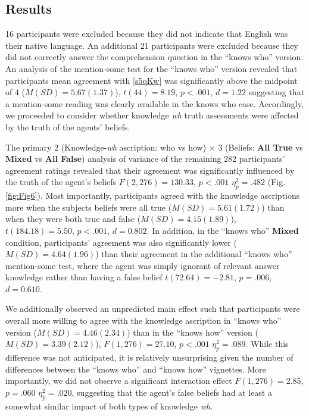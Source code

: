 \documentclass[a4paper]{article}
\begin{document}
\subsection{Results}

16 participants were excluded because they did not indicate that English was their native language. An additional 21 participants were excluded because they did not correctly answer the comprehension question in the ``knows who'' version. An analysis of the mention-some test for the ``knows who'' version revealed that participants mean agreement with \ref{s5qKw} was significantly above the midpoint of 4 (${M}({SD}) = 5.67(1.37)$), $t(44) = 8.19$, $p < .001$, $d = 1.22$ suggesting that a mention-some reading was clearly available in the knows who case. Accordingly, we proceeded to consider whether knowledge \textit{wh} truth assessments were affected by the truth of the agents' beliefs.

The primary 2 (Knowledge-\textit{wh} ascription: who vs how) $\times$ 3 (Beliefs: \textbf{All True} vs \textbf{Mixed} vs \textbf{All False}) analysis of variance of the remaining 282 participants' agreement ratings revealed that their agreement was significantly influenced by the truth of the agent's beliefs $F(2,276) = 130.33$, $p < .001$ $\eta_{p}^{2} = .482$ (Fig. \ref{fig:Fig6}). Most importantly, participants agreed with the knowledge ascriptions more when the subjects beliefs were all true (${M}({SD}) = 5.61(1.72)$) than when they were both true and false (${M}({SD}) = 4.15(1.89)$), $t(184.18) = 5.50$, $p < .001$, $d = 0.802$. In addition, in the ``knows who'' \textbf{Mixed} condition, participants' agreement was also significantly lower (${M}({SD}) = 4.64(1.96)$) than their agreement in the additional ``knows who'' mention-some test, where the agent was simply ignorant of relevant answer knowledge rather than having a false belief $t(72.64) = -2.81$, $p = .006$, $d = 0.610$.

We additionally observed an unpredicted main effect such that participants were overall more willing to agree with the knowledge ascription in ``knows who'' version (${M}({SD}) = 4.46(2.34)$) than in the ``knows how'' version (${M}({SD}) = 3.39(2.12)$), $F(1,276) = 27.10$, $p < .001$ $\eta_{p}^{2} = .089$. While this difference was not anticipated, it is relatively unsurprising given the number of differences between the ``knows who'' and ``knows how'' vignettes. More  importantly, we did not observe a significant interaction effect $F(1,276) = 2.85$, $p = .060$ $\eta_{p}^{2} = .020$, suggesting that the agent's false beliefs had at least a somewhat similar impact of both types of knowledge \textit{wh}.
    
\end{document}
